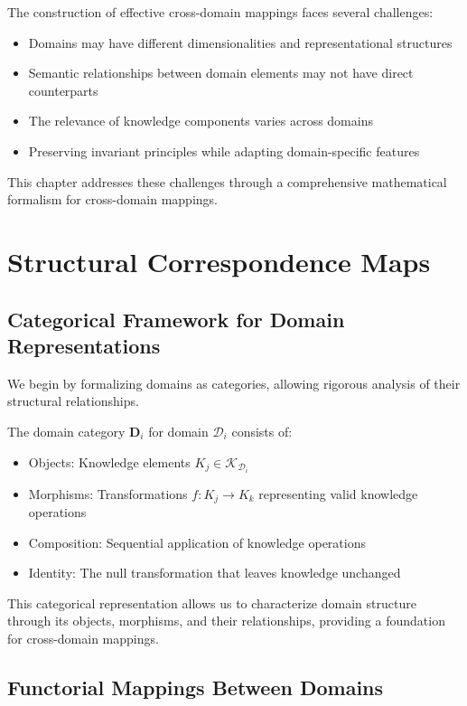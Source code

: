 The construction of effective cross-domain mappings faces several challenges:
\begin{itemize}
    \item Domains may have different dimensionalities and representational structures
    \item Semantic relationships between domain elements may not have direct counterparts
    \item The relevance of knowledge components varies across domains
    \item Preserving invariant principles while adapting domain-specific features
\end{itemize}

This chapter addresses these challenges through a comprehensive mathematical formalism for cross-domain mappings.

\section{Structural Correspondence Maps}

\subsection{Categorical Framework for Domain Representations}

We begin by formalizing domains as categories, allowing rigorous analysis of their structural relationships.

\begin{definition}
The domain category $\mathbf{D}_i$ for domain $\mathcal{D}_i$ consists of:
\begin{itemize}
    \item Objects: Knowledge elements $K_j \in \mathcal{K}_{\mathcal{D}_i}$
    \item Morphisms: Transformations $f: K_j \rightarrow K_k$ representing valid knowledge operations
    \item Composition: Sequential application of knowledge operations
    \item Identity: The null transformation that leaves knowledge unchanged
\end{itemize}
\end{definition}

This categorical representation allows us to characterize domain structure through its objects, morphisms, and their relationships, providing a foundation for cross-domain mappings.

\subsection{Functorial Mappings Between Domains}

